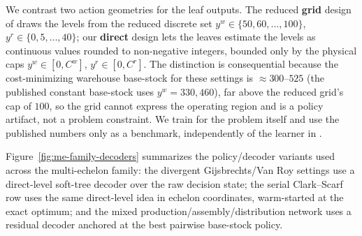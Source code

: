 \documentclass[11pt]{article}
\begin{document}
We contrast two action geometries for the leaf outputs. The reduced \textbf{grid} design of
\citet{gijsbrechts2022drl} draws the levels from the reduced discrete set $y^w\in\{50,60,\dots,100\}$,
$y^r\in\{0,5,\dots,40\}$; our \textbf{direct} design lets the leaves estimate the levels as continuous
values rounded to non-negative integers, bounded only by the physical caps $y^w\in[0,C^w]$,
$y^r\in[0,C^r]$. The distinction is consequential because the cost-minimizing warehouse base-stock
for these settings is $\approx 300$--$525$ (the published constant base-stock uses $y^w=330,460$),
far above the reduced grid's cap of $100$, so the grid cannot express the operating region and is a
policy artifact, not a problem constraint. We train for the problem itself and use the published
numbers only as a benchmark, independently of the learner in \citet{gijsbrechts2022drl}.

Figure~\ref{fig:me-family-decoders} summarizes the policy/decoder variants used across the
multi-echelon family: the divergent Gijsbrechts/Van Roy settings use a direct-level soft-tree decoder
over the raw decision state; the serial Clark--Scarf row uses the same direct-level idea in echelon
coordinates, warm-started at the exact optimum; and the mixed production/assembly/distribution network
uses a residual decoder anchored at the best pairwise base-stock policy.
\end{document}
